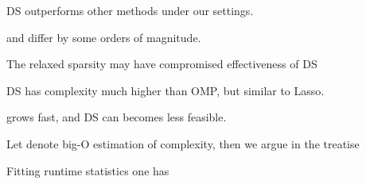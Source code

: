 {
\I DS outperforms other methods under our settings.

\I \m {\T {\chi}} and \m {\chi} differ by some orders of magnitude.

\I The relaxed sparsity may have compromised effectiveness of DS

\I DS has complexity much higher than OMP, but similar to Lasso.

\I {} grows fast, and DS can becomes less feasible.
}
{
\I Let  denote big-O estimation of complexity, then we argue in the treatise

\I Fitting runtime statistics one has
}


